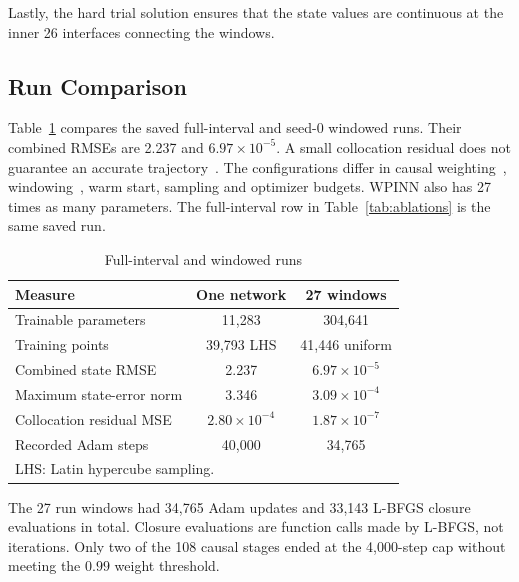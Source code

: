 \documentclass[conference,a4paper]{IEEEtran}
\begin{document}
Lastly, the hard trial solution ensures that the state values are continuous at the inner 26 interfaces connecting the windows.


\subsection{Run Comparison}
Table~\ref{tab:comparison} compares the saved full-interval and seed-0 windowed runs. Their combined RMSEs are 2.237 and $6.97\times10^{-5}$. A small collocation residual does not guarantee an accurate trajectory~\cite{rohrhofer2023}. The configurations differ in causal weighting~\cite{wang2024causal}, windowing~\cite{penwarden2023}, warm start, sampling and optimizer budgets. WPINN also has 27 times as many parameters. The full-interval row in Table~\ref{tab:ablations} is the same saved run.

\begin{table}[t]
\caption{Full-interval and windowed runs}
\label{tab:comparison}
\centering\footnotesize
\begin{tabular}{lcc}
\toprule
Measure & One network & 27 windows\\
\midrule
Trainable parameters & 11,283 & 304,641\\
Training points & 39,793 LHS & 41,446 uniform\\
Combined state RMSE & 2.237 & $6.97\times10^{-5}$\\
Maximum state-error norm & 3.346 & $3.09\times10^{-4}$\\
Collocation residual MSE & $2.80\times10^{-4}$ & $1.87\times10^{-7}$\\
Recorded Adam steps & 40,000 & 34,765\\
\bottomrule
\multicolumn{3}{l}{LHS: Latin hypercube sampling.}\\
\end{tabular}
\end{table}

The 27 run windows had 34,765 Adam updates and 33,143 L-BFGS closure evaluations in total. Closure evaluations are function calls made by L-BFGS, not iterations. Only two of the 108 causal stages ended at the 4,000-step cap without meeting the $0.99$ weight threshold.
\end{document}
